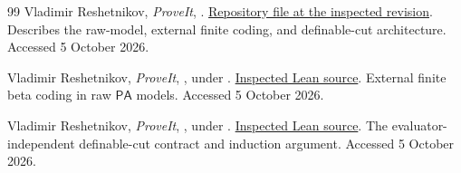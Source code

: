 \documentclass[11pt]{article}
\numberwithin{equation}{section}
\theoremstyle{definition}
\theoremstyle{remark}
\newcommand{\PA}{\mathsf{PA}}
\begin{document}
\begin{thebibliography}{99}
Vladimir Reshetnikov, \emph{ProveIt},
.
\href{https://github.com/VladimirReshetnikov/ProveIt/blob/3b9458b31f459b480ab43a068d7cc56f4cfdbb28/Logic/PeanoArithmetic/NotFinitelyAxiomatizable/README.md}{Repository file at the inspected revision}.
Describes the raw-model, external finite coding, and definable-cut
architecture. Accessed 5 October 2026.

Vladimir Reshetnikov, \emph{ProveIt},
, under
.
\href{https://github.com/VladimirReshetnikov/ProveIt/blob/3b9458b31f459b480ab43a068d7cc56f4cfdbb28/Logic/PeanoArithmetic/NotFinitelyAxiomatizable/Lean/PAFiniteBasisReduction/FiniteBetaCoding.lean}{Inspected Lean source}.
External finite beta coding in raw $\PA$ models. Accessed 5 October 2026.

Vladimir Reshetnikov, \emph{ProveIt},
, under
.
\href{https://github.com/VladimirReshetnikov/ProveIt/blob/3b9458b31f459b480ab43a068d7cc56f4cfdbb28/Logic/PeanoArithmetic/NotFinitelyAxiomatizable/Lean/PAFiniteBasisReduction/EvaluatorCutContract.lean}{Inspected Lean source}.
The evaluator-independent definable-cut contract and induction argument.
Accessed 5 October 2026.

\end{thebibliography}
\end{document}
